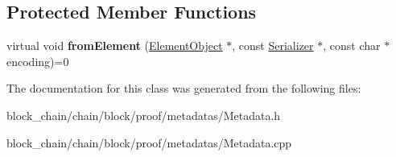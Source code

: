 \subsection*{Protected Member Functions}
\begin{DoxyCompactItemize}
\item 
\mbox{\label{classComponent_a2ded18881226d0077dc393e0e9304bb1}} 
virtual void {\bfseries from\+Element} (\mbox{\hyperlink{classElementObject}{Element\+Object}} $\ast$, const \mbox{\hyperlink{classSerializer}{Serializer}} $\ast$, const char $\ast$encoding)=0
\end{DoxyCompactItemize}


The documentation for this class was generated from the following files\+:\begin{DoxyCompactItemize}
\item 
block\+\_\+chain/chain/block/proof/metadatas/Metadata.\+h\item 
block\+\_\+chain/chain/block/proof/metadatas/Metadata.\+cpp\end{DoxyCompactItemize}
